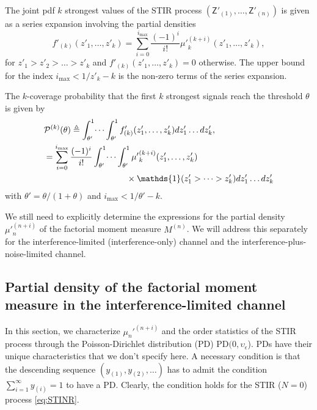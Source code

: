 \documentclass[lettersize,journal]{IEEEtran}
\begin{document}
The joint pdf $k$ strongest values of the STIR process $(\mathsf{Z}'_{(1)}, \dots, \mathsf{Z}'_{(n)})$ is given as a series expansion involving the partial densities
\begin{equation}
  \label{eq:jointprobability}
  f'_{(k)}(z'_1,\dots,z'_k)= \sum^{i_{\text{max}}}_{i=0}\frac{(-1)^i}{i!}{\mu'}_k^{(k+i)}(z'_1,\dots,z'_k),
\end{equation}
for $z'_1>z'_2>\dots>z'_k$ and $f'_{(k)}(z'_1,\dots,z'_k) =0 $ otherwise. The upper bound for the index $i_{\text{max}}<1/z'_k-k$ is the non-zero terms of the series expansion. 

The $k$-coverage probability that the first $k$ strongest signals reach the threshold $\theta$ is given by
\begin{align}
  \label{eq:kprobability}
  &\mathcal{P}^{(k)}(\theta) \triangleq  \int_{\theta'}^1\dots \int_{\theta'}^1 f'_{(k)}({z'_1},\dots,{z'_k})dz'_1 \dots d{z'_k}, \nonumber\\
  &=\sum_{i=0}^{i_{\text{max}}}\frac{(-1)^i}{i!}\int_{\theta'}^1\dots \int_{\theta'}^1 {\mu'}_k^{(k+i)}(z'_1,\dots,z'_k) \nonumber\\
  &\hspace{3.4cm}\times\mathds{1}(z'_1>\dots>z'_k) dz'_1 \dots d{z'_k}
\end{align}
with $\theta'=\theta/(1+\theta)$ and $i_{\text{max}}<1/\theta'-k$.

We still need to explicitly determine the expressions for the partial density ${\mu'}_n^{(n+i)}$ of the factorial moment measure $M^{(n)}$. We will address this separately for the interference-limited (interference-only) channel and the interference-plus-noise-limited channel.


\subsection{Partial density of the factorial moment measure in the interference-limited channel}
\label{sec:partialdensitySIR}
In this section, we characterize $\mu_n'^{(n+i)}$ and the order statistics of the STIR process through the Poisson-Dirichlet distribution (PD)  $\text{PD}(0,\upsilon_{\epsilon}$). PDs have their unique characteristics that we don't specify here. A necessary condition is that the descending sequence  $(y_{(1)},y_{(2)},\dots)$ has to admit the condition $\sum_{i=1}^{\infty}y_{(i)}=1$ to have a PD. Clearly, the condition holds for the STIR ($N=0$) process \eqref{eq:STINR}.
\end{document}
